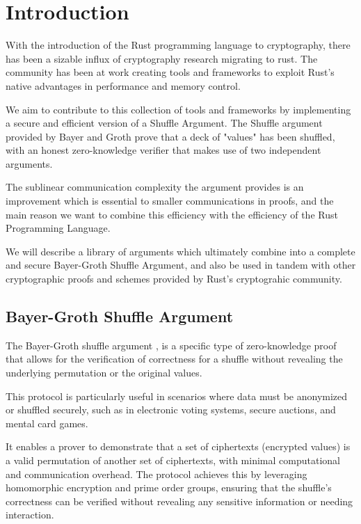 \documentclass[12pt,a4paper]{report}
\begin{document}
\newpage

\tableofcontents


\newpage
{}

\chapter{Introduction}
With the introduction of the Rust programming language to cryptography, there has been a sizable influx of cryptography research migrating to rust. 
The community has been at work creating tools and frameworks to exploit Rust's native advantages in performance and memory control. \par
We aim to contribute to this collection of tools and frameworks by implementing a secure and efficient version of a Shuffle Argument.
The Shuffle argument provided by Bayer and Groth \cite{bgshuffle} prove that a deck of "values" has been shuffled, with an honest zero-knowledge verifier that makes use of two independent arguments.\par
The sublinear communication complexity the argument provides is an improvement which is essential to smaller communications in proofs, and the main reason we want to combine this efficiency with the efficiency of the Rust Programming Language.\par
We will describe a library of arguments which ultimately combine into a complete and secure Bayer-Groth Shuffle Argument, 
and also be used in tandem with other cryptographic proofs and schemes provided by Rust's cryptograhic community.
\section{Bayer-Groth Shuffle Argument}
The Bayer-Groth shuffle argument \cite{bgshuffle}, is a specific type of zero-knowledge proof that
allows for the verification of correctness for a shuffle without revealing 
the underlying permutation or the original values. \par
This protocol is particularly useful in scenarios where data must be anonymized or shuffled 
securely, such as in electronic voting systems, secure auctions, and mental card games. \par
It enables a prover to demonstrate that a set of ciphertexts (encrypted values) is a valid 
permutation of another set of ciphertexts, with minimal computational and communication overhead.
The protocol achieves this by leveraging homomorphic encryption and prime order groups, ensuring that the shuffle's correctness can be verified without revealing any sensitive information or needing interaction.
\end{document}
